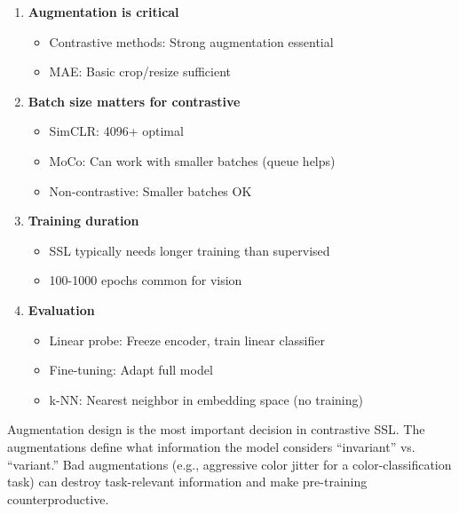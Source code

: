 \begin{enumerate}
    \item \textbf{Augmentation is critical}
    \begin{itemize}
        \item Contrastive methods: Strong augmentation essential
        \item MAE: Basic crop/resize sufficient
    \end{itemize}
    
    \item \textbf{Batch size matters for contrastive}
    \begin{itemize}
        \item SimCLR: 4096+ optimal
        \item MoCo: Can work with smaller batches (queue helps)
        \item Non-contrastive: Smaller batches OK
    \end{itemize}
    
    \item \textbf{Training duration}
    \begin{itemize}
        \item SSL typically needs longer training than supervised
        \item 100-1000 epochs common for vision
    \end{itemize}
    
    \item \textbf{Evaluation}
    \begin{itemize}
        \item Linear probe: Freeze encoder, train linear classifier
        \item Fine-tuning: Adapt full model
        \item k-NN: Nearest neighbor in embedding space (no training)
    \end{itemize}
\end{enumerate}

\begin{warningbox}
Augmentation design is the most important decision in contrastive SSL. The augmentations define what information the model considers ``invariant'' vs. ``variant.'' Bad augmentations (e.g., aggressive color jitter for a color-classification task) can destroy task-relevant information and make pre-training counterproductive.
\end{warningbox}

